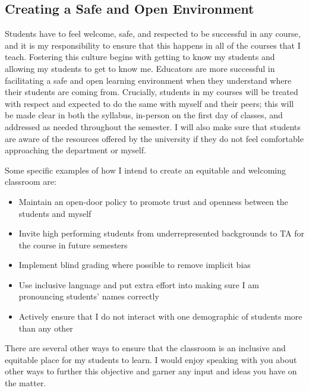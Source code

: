 \subsection*{Creating a Safe and Open Environment}
Students have to feel welcome, safe, and respected to be successful in any course, and it is my responsibility to ensure that this happens in all of the courses that I teach. Fostering this culture begins with getting to know my students and allowing my students to get to know me. Educators are more successful in facilitating a safe and open learning environment when they understand where their students are coming from. Crucially, students in my courses will be treated with respect and expected to do the same with myself and their peers; this will be made clear in both the syllabus, in-person on the first day of classes, and addressed as needed throughout the semester. I will also make sure that students are aware of the resources offered by the university if they do not feel comfortable approaching the department or myself.

Some specific examples of how I intend to create an equitable and welcoming classroom are: 
\begin{itemize}
    \item Maintain an open-door policy to promote trust and openness between the students and myself
    \item Invite high performing students from underrepresented backgrounds to TA for the course in future semesters
    \item Implement blind grading where possible to remove implicit bias
    \item Use inclusive language and put extra effort into making sure I am pronouncing students' names correctly
    \item Actively ensure that I do not interact with one demographic of students more than any other
\end{itemize}

There are several other ways to ensure that the classroom is an inclusive and equitable place for my students to learn. I would enjoy speaking with you about other ways to further this objective and garner any input and ideas you have on the matter.

